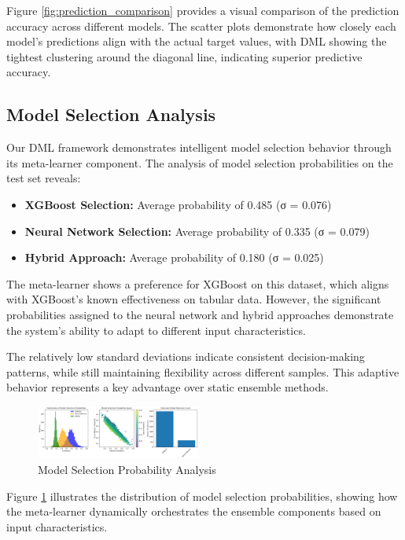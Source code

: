 \documentclass[10pt,journal,compsoc]{IEEEtran}
\begin{document}
Figure \ref{fig:prediction_comparison} provides a visual comparison of the prediction accuracy across different models. The scatter plots demonstrate how closely each model's predictions align with the actual target values, with DML showing the tightest clustering around the diagonal line, indicating superior predictive accuracy.

\subsection{Model Selection Analysis}

Our DML framework demonstrates intelligent model selection behavior through its meta-learner component. The analysis of model selection probabilities on the test set reveals:

\begin{itemize}
    \item \textbf{XGBoost Selection:} Average probability of 0.485 (σ = 0.076)
    \item \textbf{Neural Network Selection:} Average probability of 0.335 (σ = 0.079) 
    \item \textbf{Hybrid Approach:} Average probability of 0.180 (σ = 0.025)
\end{itemize}

The meta-learner shows a preference for XGBoost on this dataset, which aligns with XGBoost's known effectiveness on tabular data. However, the significant probabilities assigned to the neural network and hybrid approaches demonstrate the system's ability to adapt to different input characteristics.

The relatively low standard deviations indicate consistent decision-making patterns, while still maintaining flexibility across different samples. This adaptive behavior represents a key advantage over static ensemble methods.

\begin{figure}[htbp]
\centerline{\includegraphics[width=0.48\textwidth]{dml_weight_analysis.png}}
\caption{Model Selection Probability Analysis}
\label{fig:model_selection}
\end{figure}

Figure \ref{fig:model_selection} illustrates the distribution of model selection probabilities, showing how the meta-learner dynamically orchestrates the ensemble components based on input characteristics.
\end{document}

